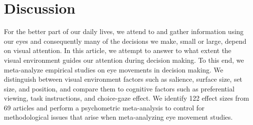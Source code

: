 
\section{Discussion}

For the better part of our daily lives, we attend to and gather information using our eyes and consequently many of the decisions we make, small or large, depend on visual attention. In this article, we attempt to answer to what extent the visual environment guides our attention during decision making. To this end, we meta-analyze empirical studies on eye movements in decision making. We distinguish between visual environment factors such as salience, surface size, set size, and position, and compare them to cognitive factors such as preferential viewing, task instructions, and choice-gaze effect. We identify 122 effect sizes from 69 articles and perform a psychometric meta-analysis to control for methodological issues that arise when meta-analyzing eye movement studies.

